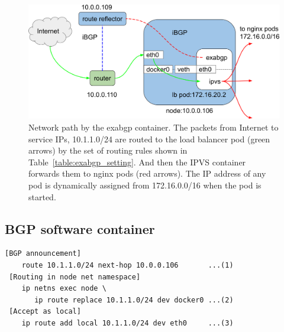 \begin{figure}[h]
  \centering
  \includegraphics[width=0.9\columnwidth]{Figs/exabgp}
  
  \par\bigskip
  \centering
  \begin{minipage}{0.9\columnwidth}
    \caption[Network path by the exabgp container]{
      Network path by the exabgp container.
      The packets from Internet to service IPs, 10.1.1.0/24 are routed to the load balancer pod (green arrows) by the set of routing rules shown in Table~\ref{table:exabgp_setting}.
      And then the IPVS container forwards them to nginx pods (red arrows).
      The IP address of any pod is dynamically assigned from 172.16.0.0/16 when the pod is started. 
    }
    \label{fig:exabgp_schem}
  \end{minipage}

\end{figure}

\subsection{BGP software container}\label{sec:bgp}

\begin{table}

  \centering
  \begin{minipage}{0.85\columnwidth}
    \begin{lstlisting}[frame=lines,breaklines=true,basicstyle=\small\ttfamily]
 [BGP announcement]
    route 10.1.1.0/24 next-hop 10.0.0.106       ...(1)
 [Routing in node net namespace]
    ip netns exec node \
       ip route replace 10.1.1.0/24 dev docker0 ...(2)
 [Accept as local]
    ip route add local 10.1.1.0/24 dev eth0     ...(3)
    \end{lstlisting}
  \end{minipage}

  \par\bigskip
  \centering
  \begin{minipage}{0.9\columnwidth}
    \caption[Required settings in the exabgp container]{
      Required settings in the exabgp container.
      (1) The node IP address, 10.0.0.106 is used as next-hop for the service IPs, 10.1.1.0/24, in BGP announcement.
      (2) In order to route the packets destined toward the service IP to the container, a routing rule to the dev docker0 is created in the node net namespace. 
      (3) A routing rule to accept the packets destined toward the service IPs,  as local is also required.
    }
    \label{table:exabgp_setting}
  \end{minipage}

\end{table}

